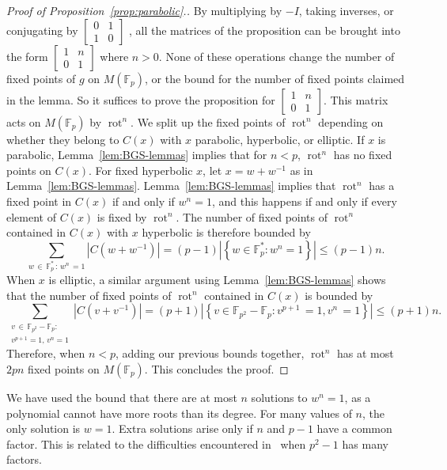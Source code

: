\documentclass[AHL, Unicode, longabstracts, published]{cedram}
\newcommand{\F}{\mathbb{F}}
\DeclareMathOperator{\rot}{rot}
\begin{document}
\begin{proof}[{Proof of Proposition~\ref{prop:parabolic}.}]
By multiplying by $-I$, taking inverses, or conjugating by 
$\left[
\begin{smallmatrix}
0 & 1 \\
1 & 0
\end{smallmatrix}\right]$
, all the matrices of the proposition can be brought into the form $
\left[
\begin{smallmatrix}
1 & n\\
0 & 1
\end{smallmatrix}\right]$ where $n>0$. None of these operations change the number of fixed points of $g$ on $M(\F_{p})$, or the bound for the number of fixed points claimed in the lemma. So it suffices to prove the proposition for $\left[
\begin{smallmatrix}
1 & n\\
0 & 1
\end{smallmatrix}\right]$. This matrix acts on $M(\F_{p})$ by $\rot^{n}$. We split up the fixed points of $\rot^{n}$ depending on whether they belong to $C(x)$ with $x$ parabolic, hyperbolic, or elliptic. If $x$ is parabolic, Lemma~\ref{lem:BGS-lemmas} implies that for $n<p$, $\rot^{n}$ has no fixed points on $C(x)$. For fixed hyperbolic $x$, let $x=w+w^{-1}$ as in Lemma~\ref{lem:BGS-lemmas}. Lemma~\ref{lem:BGS-lemmas} implies that $\rot^{n}$ has a fixed point in $C(x)$ if and only if $w^{n}=1$, and this happens if and only if every element of $C(x)$ is fixed by $\rot^{n}$. The number of fixed points of $\rot^{n}$ contained in $C(x)$ with $x$ hyperbolic is therefore bounded by
\[
\sum_{w\,\in\,\F_{p}^{*}\,:\,w^{n}\,=1}\left|C\left(w+w^{-1}\right)\right|=(p-1)|\left\{w\in\F_{p}^{*}:w^{n}=1\right\}|\leq(p-1)n.
\]
When $x$ is elliptic, a similar argument using Lemma~\ref{lem:BGS-lemmas} shows that the number of fixed points of $\rot^{n}$ contained in $C(x)$ is bounded by
\[
\sum_{ \substack{v\,\in\,\F_{p^{2}}-\F_{p} : \\ v^{p+1}=1,\,v^{n}=1 } }\left|C\left(v+v^{-1}\right)\right|=(p+1)|\left\{v\in\F_{p^{2}}-\F_{p}:v^{p+1}\,=1,v^{n}\,=1\right\}| \leq(p+1)n.
\]
Therefore, when $n<p$, adding our previous bounds together, $\rot^{n}$ has at most $2pn$ fixed points on $M(\F_{p})$. This concludes the proof.
\end{proof}

We have used the bound that there are at most $n$ solutions to $w^n = 1$, as a polynomial cannot have more roots than its degree. For many values of $n$, the only solution is $w=1$. Extra solutions arise only if $n$ and $p-1$ have a common factor. This is related to the difficulties encountered in~\cite{BGS} when $p^2-1$ has many factors.
\end{document}
